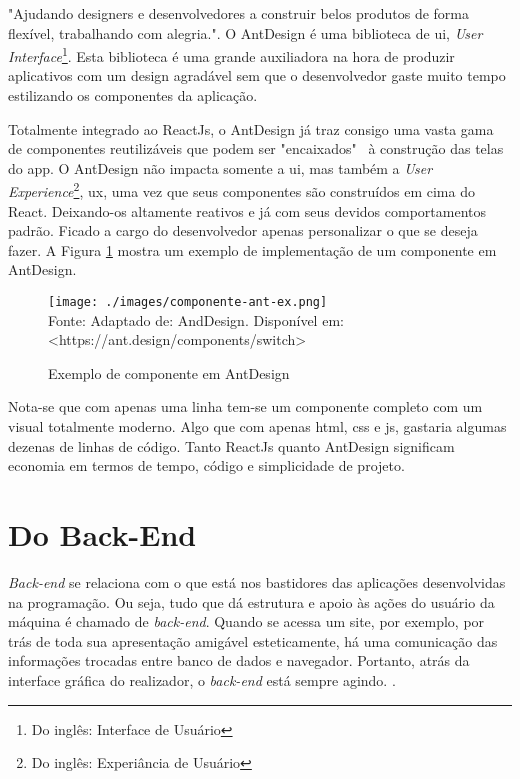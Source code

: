 "Ajudando designers e desenvolvedores a construir belos produtos de forma flexível, trabalhando com alegria.".
O AntDesign é uma biblioteca de
\acrshort{ui},
\textit{User Interface}\footnote{Do inglês: Interface de Usuário
}.
Esta biblioteca é uma grande auxiliadora na hora de produzir aplicativos
com um design agradável sem que o desenvolvedor gaste muito tempo
estilizando os componentes da aplicação.

Totalmente integrado ao ReactJs, o AntDesign já traz consigo uma vasta
gama de componentes reutilizáveis que podem ser "encaixados"~ à
construção das telas do app.
O AntDesign não impacta somente a
\acrshort{ui},
mas também a
\textit{User Experience}\footnote{Do inglês: Experiância de Usuário
},
\acrshort{ux}, uma vez que seus componentes são construídos
em cima do React. Deixando-os altamente reativos e já com seus
devidos comportamentos padrão. Ficado a cargo do desenvolvedor
apenas personalizar o que se deseja fazer.
A
Figura \ref{fig:componente-ant-ex}
mostra um exemplo de implementação de um componente em AntDesign.

\begin{figure}[H]
    \centering
    \caption{Exemplo de componente em AntDesign}
    \texttt{[image: ./images/componente-ant-ex.png]}
    \label{fig:componente-ant-ex} \\
    \textnormal{\fontsize{10pt}{12pt}Fonte: Adaptado de: AndDesign. Disponível em: <https://ant.design/components/switch>}
\end{figure}

Nota-se que com apenas uma linha tem-se um componente completo com
um visual totalmente moderno. Algo que com apenas
\acrshort{html},
\acrshort{css}
e
\acrshort{js},
gastaria algumas dezenas de linhas de código.
Tanto ReactJs quanto AntDesign significam economia
em termos de tempo, código e simplicidade de projeto.

\section{Do Back-End}

\textit{Back-end} se relaciona com o que está nos bastidores das aplicações desenvolvidas na programação. Ou seja, tudo que dá estrutura e apoio às ações do usuário da máquina é chamado de \textit{back-end}. Quando se acessa um site, por exemplo, por trás de toda sua apresentação amigável esteticamente, há uma comunicação das informações trocadas entre banco de dados e navegador. Portanto, atrás da interface gráfica do realizador, o \textit{back-end} está sempre agindo.
\cite{totvs-back-end}.

